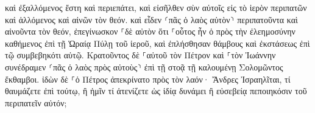 \documentclass{openreader}
\begin{document}
καὶ ἐξαλλόμενος ἔστη καὶ περιεπάτει, καὶ εἰσῆλθεν σὺν αὐτοῖς εἰς τὸ ἱερὸν περιπατῶν καὶ ἁλλόμενος καὶ αἰνῶν τὸν θεόν. 
καὶ εἶδεν ⸂πᾶς ὁ λαὸς αὐτὸν⸃ περιπατοῦντα καὶ αἰνοῦντα τὸν θεόν, 
ἐπεγίνωσκον ⸀δὲ αὐτὸν ὅτι ⸀οὗτος ἦν ὁ πρὸς τὴν ἐλεημοσύνην καθήμενος ἐπὶ τῇ Ὡραίᾳ Πύλῃ τοῦ ἱεροῦ, καὶ ἐπλήσθησαν θάμβους καὶ ἐκστάσεως ἐπὶ τῷ συμβεβηκότι αὐτῷ. 
Κρατοῦντος δὲ ⸀αὐτοῦ τὸν Πέτρον καὶ ⸀τὸν Ἰωάννην συνέδραμεν ⸂πᾶς ὁ λαὸς πρὸς αὐτοὺς⸃ ἐπὶ τῇ στοᾷ τῇ καλουμένῃ Σολομῶντος ἔκθαμβοι. 
ἰδὼν δὲ ⸀ὁ Πέτρος ἀπεκρίνατο πρὸς τὸν λαόν· Ἄνδρες Ἰσραηλῖται, τί θαυμάζετε ἐπὶ τούτῳ, ἢ ἡμῖν τί ἀτενίζετε ὡς ἰδίᾳ δυνάμει ἢ εὐσεβείᾳ πεποιηκόσιν τοῦ περιπατεῖν αὐτόν; 
\end{document}
